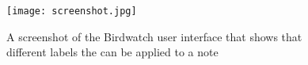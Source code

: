 \documentclass [11pt, proquest] {uwthesis}[2020/02/24]
\newenvironment{demo}
  {\begin{alltt}\leftskip3em
     \def\\{\ttfamily\char`\\}%
     \def\{{\ttfamily\char`\{}%
     \def\}{\ttfamily\char`\}}}
  {\end{alltt}}
\begin{document}













%
\nocite{*}   %
% 


%
%
\appendix
\chapter{}
\raggedbottom\sloppy
 \begin{figure}[h]
\centering
\texttt{[image: screenshot.jpg]}
\caption{A screenshot of the Birdwatch user interface that shows that different labels the can be applied to a note }
\label{fig:labels}
\end{figure}
\end{document}
